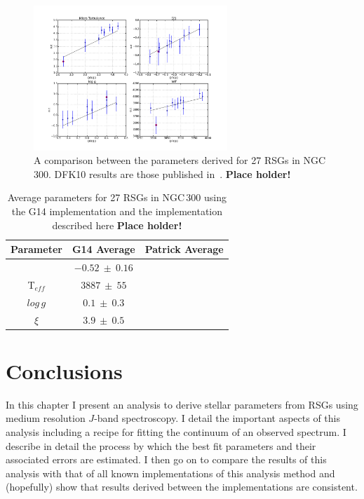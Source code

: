 \begin{figure}
 \centering
 \includegraphics[width=0.65\textwidth]{JAnal/compare-DFK10}
 \caption[NGC\,300 G14]{
A comparison between the parameters derived for 27 RSGs in NGC\,300.
DFK10 results are those published in~\cite{2015ApJ...805..182G}.
\textbf{Place holder!}\label{fig:n300G14}
         }
\end{figure}

\begin{table}
\caption[Parameter comparisons G14]{Average parameters for 27 RSGs in NGC\,300 using the G14 implementation and the implementation described here
\textbf{Place holder!}\label{tb:G14}}
\scriptsize
\begin{center}
\begin{tabular}{ccc}
 \hline
 \hline
Parameter & G14 Average & Patrick Average \\
 \hline
[Z]       & $-0.52~\pm~0.16$ &  \\
T$_{eff}$ & $3887~\pm~55$ &  \\
$log\,g$  & $0.1~\pm~0.3$ &  \\
$\xi$     & $3.9~\pm~0.5$ &  \\
 \hline
\end{tabular}
\end{center}
\end{table}

\section{Conclusions} %
\label{sub:conclusions}
In this chapter I present an analysis to derive stellar parameters from RSGs using medium resolution $J$-band spectroscopy.
I detail the important aspects of this analysis including a recipe for fitting the continuum of an observed spectrum.
I describe in detail the process by which the best fit parameters and their associated errors are estimated.
I then go on to compare the results of this analysis with that of all known implementations of this analysis method and (hopefully) show that results derived between the implementations are consistent.

